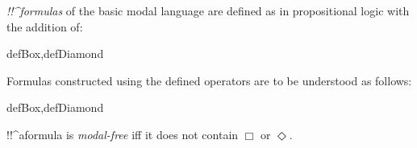 \documentclass[../../../../include/open-logic-section]{subfiles}
\begin{document}


\begin{defn}

\emph{!!^{formula}s} of the basic modal language are defined as in
propositional logic with the addition of:

    \begin{enumerate}
      
      \end{enumerate}

\end{defn}
    
\begin{tagblock}{defBox,defDiamond}
\begin{defn}
    Formulas constructed using the defined operators are to be understood
    as follows:
    
    \begin{tagenumerate}{defBox,defDiamond}
    
    
    \end{tagenumerate}
\end{defn}
\end{tagblock}

!!^a{formula} is \emph{modal-free} iff it does not contain $\Box$ or
$\Diamond$.
    
\end{document}
